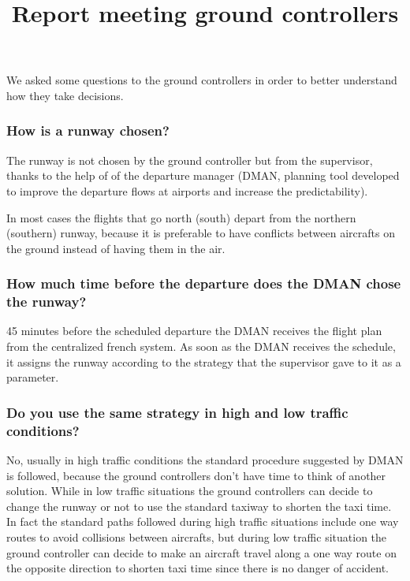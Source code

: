 \documentclass{article}
\begin{document}
	\title{Report meeting ground controllers}
	\maketitle

We asked some questions to the ground controllers in order to better understand how they take decisions.


\subsubsection*{How is a runway chosen?}


The runway is not chosen by the ground controller but from the supervisor, thanks to the help of of the departure manager (DMAN, planning tool developed to improve the departure flows at airports and increase the predictability). 

In most cases the flights that go north (south) depart from the northern (southern) runway, because it is preferable to have conflicts between aircrafts on the ground instead of having them in the air.


\subsubsection*{How much time before the departure does the DMAN chose the runway?}

45 minutes before the scheduled departure the DMAN receives the flight plan from the centralized french system. As soon as the DMAN receives the schedule, it assigns the runway according to the strategy that the supervisor gave to it as a parameter.

\subsubsection*{Do you use the same strategy in high and low traffic conditions?}

No, usually in high traffic conditions the standard procedure suggested by DMAN is followed, because the ground controllers don't have time to think of another solution. While in low traffic situations the ground controllers can decide to change the runway or not to use the standard taxiway to shorten the taxi time. 
In fact the standard paths followed during high traffic situations include one way routes to avoid collisions between aircrafts, but during low traffic situation the ground controller can decide to make an aircraft travel along a one way route on the opposite direction to shorten taxi time since there is no danger of accident.
\end{document}
